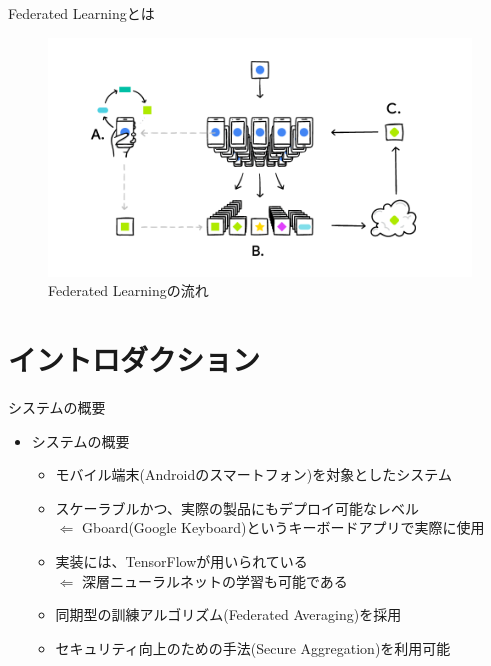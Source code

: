 \documentclass[dvipdfmx,notheorems,t]{beamer}
\begin{document}
\begin{frame}{Federated Learningとは}

\begin{figure}
	\centering
	\includegraphics[keepaspectratio, scale=0.3]{federated-learning-flow.png}
	\caption{Federated Learningの流れ~\cite{mcmahan_ramage_2017}}
	\label{fig:federated-learning-flow}
\end{figure}

\end{frame}

\section{イントロダクション}

\begin{frame}{システムの概要}

\begin{itemize}
	\item システムの概要
	\begin{itemize}
		\item モバイル端末(Androidのスマートフォン)を対象としたシステム
		\newline
		\item スケーラブルかつ、実際の製品にもデプロイ可能なレベル \\
		$\Leftarrow$ Gboard(Google Keyboard)というキーボードアプリで実際に使用
		\newline
		\item 実装には、TensorFlowが用いられている \\
		$\Leftarrow$ 深層ニューラルネットの学習も可能である
		\newline
		\item 同期型の訓練アルゴリズム(\alert{Federated Averaging})を採用
		\item セキュリティ向上のための手法(\alert{Secure Aggregation})を利用可能
	\end{itemize}
\end{itemize}

\end{frame}
\end{document}
